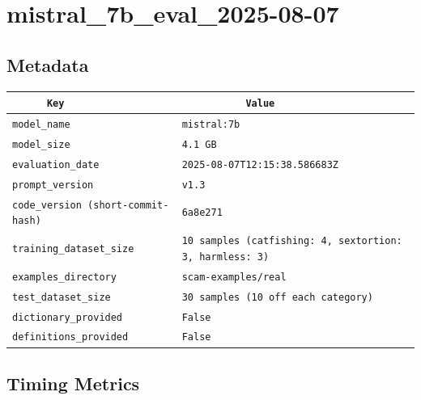 \documentclass{article}
\begin{document}
\section{mistral\_7b\_eval\_2025-08-07}
\subsection{Metadata}

\begin{center}
\begin{tabular}{l | l} \hline
    \verb|      Key      | & \verb|           Value           | \\ \hline
    \hline
    \verb|model_name    | & \verb|mistral:7b                   | \\ \hline
    \verb|model_size    | & \verb|4.1 GB                       | \\ \hline
    \verb|evaluation_date| & \verb|2025-08-07T12:15:38.586683Z  | \\ \hline
    \verb|prompt_version| & \verb|v1.3                         | \\ \hline
    \verb|code_version (short-commit-hash)| & \verb|6a8e271                      | \\ \hline
    \verb|training_dataset_size| & \verb|10 samples (catfishing: 4, sextortion: 3, harmless: 3)| \\ \hline
    \verb|examples_directory| & \verb|scam-examples/real           | \\ \hline
    \verb|test_dataset_size| & \verb|30 samples (10 off each category)| \\ \hline
    \verb|dictionary_provided| & \verb|False                        | \\ \hline
    \verb|definitions_provided| & \verb|False                        | \\ \hline
\end{tabular}
\end{center}

\subsection{Timing Metrics}
\end{document}
